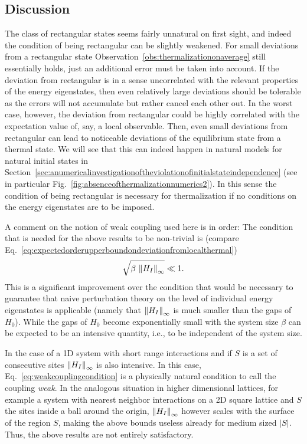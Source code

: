 \documentclass[a4paper,12pt,listof=totoc,index=totoc,bibliography=totoc,headsepline=false,headings=normal,BCOR16.153846mm,DIV12,headinclude,twoside,cleardoublepage=empty,numbers=noenddot,final]{scrreprt}
\theoremstyle{mystyle}
\numberwithin{equation}{section}
\numberwithin{figure}{section}
\numberwithin{lemma}{section}
\numberwithin{theorem}{section}
\numberwithin{corollary}{section}
\numberwithin{definition}{section}
\numberwithin{conjecture}{section}
\numberwithin{observation}{section}
\newcommand{\+}{\mkern2mu}
\newcommand{\texteqref}[1]{Eq.~\eqref{#1}}
\renewcommand{\H}{H}
\newcommand{\norm}[2][]{
  \ifthenelse{\equal{#1}{}}
    {\left\| {#2} \right\|}
    {\ifthenelse{\equal{#1}{uinv}}
      {\left\vert\kern-0.25ex\left\vert\kern-0.25ex\left\vert {#2} \right\vert\kern-0.25ex\right\vert\kern-0.25ex\right\vert}
      {\left\| {#2} \right\|_{#1}}
    }
}
\DeclareMathOperator{\1}{\mathds{1}}
\begin{document}
\subsection*{Discussion}
%
The class of rectangular states seems fairly unnatural on first sight, and indeed the condition of being rectangular can be slightly weakened.
For small deviations from a rectangular state Observation~\ref{obs:thermalizationonaverage} still essentially holds, just an additional error must be taken into account.
If the deviation from rectangular is in a sense uncorrelated with the relevant properties of the energy eigenstates, then even relatively large deviations should be tolerable as the errors will not accumulate but rather cancel each other out.
In the worst case, however, the deviation from rectangular could be highly correlated with the expectation value of, say, a local observable.
Then, even small deviations from rectangular can lead to noticeable deviations of the equilibrium state from a thermal state.
We will see that this can indeed happen in natural models for natural initial states in Section~\ref{sec:anumericalinvestigationoftheviolationofinitialstateindependence} (see in particular Fig.~\ref{fig:absenceofthermalizationnumerics2}).
In this sense the condition of being rectangular is necessary for thermalization if no conditions on the energy eigenstates are to be imposed.

A comment on the notion of weak coupling used here is in order:
The condition that is needed for the above results to be non-trivial is (compare \texteqref{eq:expectedorderupperboundondeviationfromlocalthermal})
\begin{equation} \label{eq:weakcouplingcondition}
  \sqrt{\beta\,\norm[\infty]{H_I}} \ll 1 .
\end{equation}
This is a significant improvement over the condition that would be necessary to guarantee that naive perturbation theory on the level of individual energy eigenstates is applicable (namely that $\norm[\infty]{H_I}$ is much smaller than the gaps of $\H_0$).
While the gaps of $\H_0$ become exponentially small with the system size $\beta$ can be expected to be an intensive quantity, i.e., to be independent of the system size.

In the case of a 1D system with short range interactions and if $S$ is a set of consecutive sites $\norm[\infty]{H_I}$ is also intensive.
In this case, \texteqref{eq:weakcouplingcondition} is a physically natural condition to call the coupling \emph{weak}.
In the analogous situation in higher dimensional lattices, for example a system with nearest neighbor interactions on a 2D square lattice and $S$ the sites inside a ball around the origin, $\norm[\infty]{H_I}$ however scales with the surface of the region $S$, making the above bounds useless already for medium sized $|S|$.
Thus, the above results are not entirely satisfactory.
\end{document}
